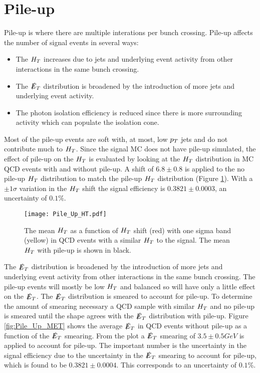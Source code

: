 \section{Pile-up}

Pile-up is where there are multiple interations per bunch crossing. Pile-up 
affects the number of signal events in several ways:

\begin{itemize}
\item The $H_{T}$ increases due to jets and underlying event activity from other 
interactions in the same bunch crossing.
\item The $\slashed{E}_{T}$ distribution is broadened by the introduction of more jets and
underlying event activity.
\item The photon isolation efficiency is reduced since there is more 
surrounding activity which can populate the isolation cone.
\end{itemize}

Most of the pile-up events are soft with, at most, low $p_{T}$ jets and do not
contribute much to $H_{T}$. Since the signal MC does not have pile-up simulated, 
the effect of pile-up on the $H_{T}$ is evaluated by looking at the $H_{T}$ 
distribution in MC QCD events with and without pile-up. A shift of $6.8\pm0.8$ 
is applied to the no pile-up $H_{T}$ distribution to match the pile-up $H_{T}$ 
distribution (Figure \ref{fig:Pile_Up_HT}). With a $\pm1\sigma$ variation in 
the $H_{T}$ shift the signal efficiency is $0.3821\pm0.0003$, an uncertainty of
$0.1\unit{\%}$. \\

\begin{figure}
\begin{center}
\texttt{[image: Pile\_Up\_HT.pdf]}
\end{center}
\caption{The mean $H_{T}$ as a function of $H_{T}$ shift (red) with one sigma band 
(yellow) in QCD events with a similar $H_{T}$ to the signal. The mean $H_{T}$ with 
pile-up is shown in black.}
\label{fig:Pile_Up_HT}
\end{figure}

The $\slashed{E}_{T}$ distribution is broadened by the introduction of more jets and
underlying event activity from other interactions in the same bunch crossing. 
The pile-up events will mostly be low $H_{T}$ and balanced so will have only a 
little effect on the $\slashed{E}_{T}$. The $\slashed{E}_{T}$ distribution is smeared to account for 
pile-up. To determine the amount of smearing necessary a QCD sample with similar 
$H_{T}$ and no pile-up is smeared until the shape agrees with the $\slashed{E}_{T}$ 
distribution with pile-up. Figure \ref{fig:Pile_Up_MET} shows the 
average $\slashed{E}_{T}$ in QCD events without pile-up as a function of the $\slashed{E}_{T}$ 
smearing. From the plot a $\slashed{E}_{T}$ smearing of $3.5\pm0.5\unit{GeV}$ is applied to 
account for pile-up. The important number is the uncertainty in
the signal efficiency due to the uncertainty in the $\slashed{E}_{T}$ smearing to account
for pile-up, which is found to be $0.3821\pm0.0004$. This corresponds to an
uncertainty of $0.1\unit{\%}$.\\

